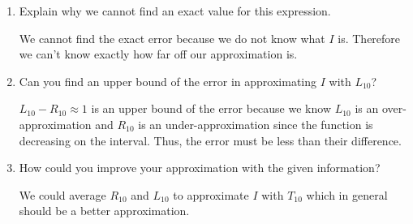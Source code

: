 \documentclass[main]{subfiles}
\begin{document}
\begin{enumerate}
\begin{enumerate}
       \begin{solution}
           $I-L_{10}$ gives the difference between the integral and our approximation. In order to focus solely on the size of the error, we will express the error as $|I-L_{10}|.$ 
       \end{solution}
        \item \begin{problem}[\vfill]
            Explain why we cannot find an exact value for this expression.
        \end{problem}
        
        \begin{solution}
            We cannot find the exact error because we do not know what $I$ is. Therefore we can't know exactly how far off our approximation is.
        \end{solution}
            
       
        \item \begin{problem}[\vfill]
            Can you find an upper bound of the error in approximating $I$ with $L_{10}$?
        \end{problem}
        
        \begin{solution}
            $L_{10}-R_{10}\approx1$ is an upper bound of the error because we know $L_{10}$ is an over-approximation and $R_{10}$ is an under-approximation since the function is decreasing on the interval. Thus, the error must be less than their difference.
        \end{solution}
        
        \item \begin{problem}[\vfill]
            How could you improve your approximation with the given information?
        \end{problem}
        
       \begin{solution}
           We could average $R_{10}$ and $L_{10}$ to approximate $I$ with $T_{10}$ which in general should be a better approximation.
       \end{solution}
    \end{enumerate}





\end{enumerate}


 
\end{document}
